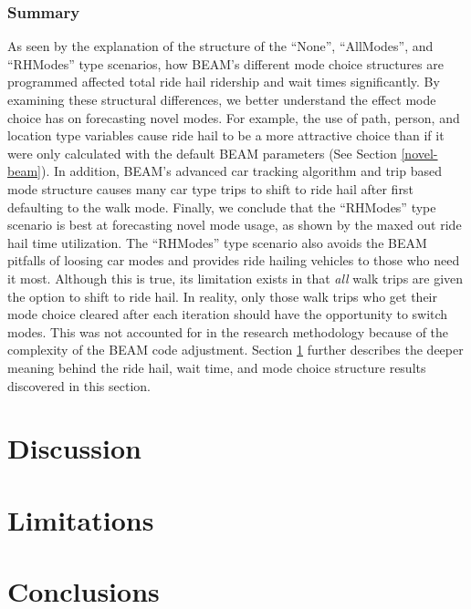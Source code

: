 \documentclass[12pt, oneside, openright]{byuthesis}
\begin{document}
\hypertarget{summary-2}{%
\subsection{Summary}\label{summary-2}}

As seen by the explanation of the structure of the ``None'', ``AllModes'', and ``RHModes'' type scenarios, how BEAM's different mode choice structures are programmed affected total ride hail ridership and wait times significantly. By examining these structural differences, we better understand the effect mode choice has on forecasting novel modes. For example, the use of path, person, and location type variables cause ride hail to be a more attractive choice than if it were only calculated with the default BEAM parameters (See Section \ref{novel-beam}). In addition, BEAM's advanced car tracking algorithm and trip based mode structure causes many car type trips to shift to ride hail after first defaulting to the walk mode. Finally, we conclude that the ``RHModes'' type scenario is best at forecasting novel mode usage, as shown by the maxed out ride hail time utilization. The ``RHModes'' type scenario also avoids the BEAM pitfalls of loosing car modes and provides ride hailing vehicles to those who need it most. Although this is true, its limitation exists in that \emph{all} walk trips are given the option to shift to ride hail. In reality, only those walk trips who get their mode choice cleared after each iteration should have the opportunity to switch modes. This was not accounted for in the research methodology because of the complexity of the BEAM code adjustment. Section \ref{discussion} further describes the deeper meaning behind the ride hail, wait time, and mode choice structure results discovered in this section.

\hypertarget{discussion}{%
\chapter{Discussion}\label{discussion}}

\hypertarget{limitations}{%
\chapter{Limitations}\label{limitations}}

\hypertarget{conclusions}{%
\chapter{Conclusions}\label{conclusions}}
\end{document}
